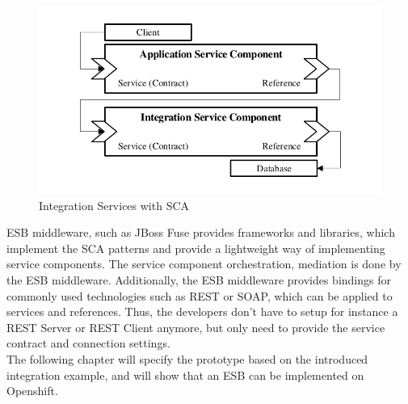 \begin{figure}[htbp]
	\centering
	\includegraphics[scale=1]{images/esb-sca-example.pdf}
	\caption{Integration Services with SCA}
	\label{fig:esb-design-sca}
\end{figure}
  
ESB middleware, such as JBoss Fuse provides frameworks and libraries, which implement the SCA patterns and provide a lightweight way of implementing service components. The service component orchestration, mediation is done by the ESB middleware. Additionally, the ESB middleware provides bindings for commonly used technologies such as REST or SOAP, which can be applied to services and references. Thus, the developers don't have to setup for instance a REST Server or REST Client anymore, but only need to provide the service contract and connection settings\cite{MicroSoa2008, Richards2015}.\\

The following chapter will specify the prototype based on the introduced integration example, and will show that an ESB can be implemented on Openshift.
